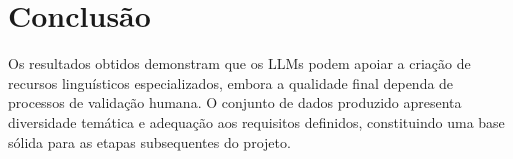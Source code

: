 \section{Conclusão}

Os resultados obtidos demonstram que os LLMs podem apoiar a criação de recursos linguísticos especializados, embora a qualidade final dependa de processos de validação humana. O conjunto de dados produzido apresenta diversidade temática e adequação aos requisitos definidos, constituindo uma base sólida para as etapas subsequentes do projeto.